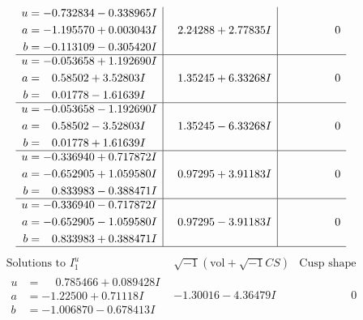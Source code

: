 \documentclass[1p]{elsarticle_modified}
\theoremstyle{definition}
\newcommand{\I}{\sqrt{-1}}
\begin{document}
$$\begin{array}{c|c|c}
\begin{aligned}
u &= -0.732834 - 0.338965 I \\
a &= -1.195570 + 0.003043 I \\
b &= -0.113109 - 0.305420 I\end{aligned}
 & \phantom{-}2.24288 + 2.77835 I & \phantom{-0.000000 } 0 \\ \hline\begin{aligned}
u &= -0.053658 + 1.192690 I \\
a &= \phantom{-}0.58502 + 3.52803 I \\
b &= \phantom{-}0.01778 - 1.61639 I\end{aligned}
 & \phantom{-}1.35245 + 6.33268 I & \phantom{-0.000000 } 0 \\ \hline\begin{aligned}
u &= -0.053658 - 1.192690 I \\
a &= \phantom{-}0.58502 - 3.52803 I \\
b &= \phantom{-}0.01778 + 1.61639 I\end{aligned}
 & \phantom{-}1.35245 - 6.33268 I & \phantom{-0.000000 } 0 \\ \hline\begin{aligned}
u &= -0.336940 + 0.717872 I \\
a &= -0.652905 + 1.059580 I \\
b &= \phantom{-}0.833983 - 0.388471 I\end{aligned}
 & \phantom{-}0.97295 + 3.91183 I & \phantom{-0.000000 } 0 \\ \hline\begin{aligned}
u &= -0.336940 - 0.717872 I \\
a &= -0.652905 - 1.059580 I \\
b &= \phantom{-}0.833983 + 0.388471 I\end{aligned}
 & \phantom{-}0.97295 - 3.91183 I & \phantom{-0.000000 } 0\\
 \hline 
 \end{array}$$\newpage$$\begin{array}{c|c|c}  
\text{Solutions to }I^u_{1}& \I (\text{vol} + \sqrt{-1}CS) & \text{Cusp shape}\\
 \hline 
\begin{aligned}
u &= \phantom{-}0.785466 + 0.089428 I \\
a &= -1.22500 + 0.71118 I \\
b &= -1.006870 - 0.678413 I\end{aligned}
 & -1.30016 - 4.36479 I & \phantom{-0.000000 } 0 \\ \hline\begin{aligned}

\end{aligned}
\end{array}$$
\end{document}
